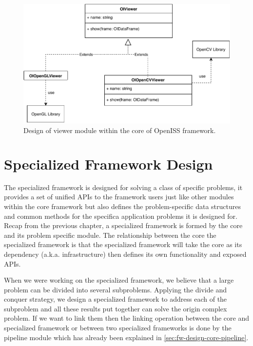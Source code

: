 \begin{figure}
    \centering
    \includegraphics[scale=0.8]{figures/framework_core_viewer.pdf}
    \caption{Design of viewer module within the core of OpenISS framework.}
    \label{fig:fw-core-viewer}
\end{figure}

\section{Specialized Framework Design}
\label{sec:fw-design-spec}

The specialized framework is designed for solving a class of specific problems,
it provides a set of unified APIs to the framework users just like other
modules within the core framework but also defines the problem-specific data
structures and common methods for the specifica application problems it is 
designed for.
Recap from the previous chapter, a specialized framework is formed by the 
core and its problem specific module. The relationship between the core
the specialized framework is that the specialized framework will take the 
core as its dependency (a.k.a. infrastructure) then defines its own
functionality and exposed APIs. 

When we were working on the specialized framework, we believe that a large 
problem can be divided into several subproblems. Applying the divide 
and conquer strategy, we design a specialized framework to address each
of the subproblem and all these results put together can solve the origin
complex problem. If we want to link them then the linking operation between the 
core and specialized framework or between two specialized frameworks is done by 
the pipeline module which has already been explained in
\autoref{sec:fw-design-core-pipeline}.

